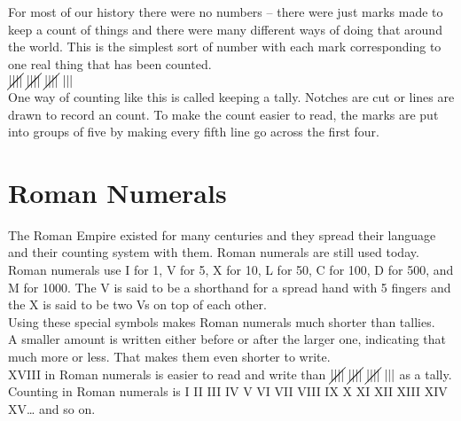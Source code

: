 \documentclass{article}
\begin{document}
For most of our history there were no numbers – there were just marks made to keep a count of things and there were many different ways of doing that around the world. This is the simplest sort of number with each mark corresponding to one real thing that has been counted.\\

$\cancel{||||}\ \cancel{||||}\ \cancel{||||}\ |||$\\

One way of counting like this is called keeping a tally. Notches are cut or lines are drawn to record an count. To make the count easier to read, the marks are put into groups of five by making every fifth line go across the first four.

\newpage

\section*{Roman Numerals}

The Roman Empire existed for many centuries and they spread their language and their counting system with them. Roman numerals are still used today.\\

Roman numerals use I for 1, V for 5, X for 10, L for 50, C for 100, D for 500, and M for 1000. The V is said to be a shorthand for a spread hand with 5 fingers and the X is said to be two Vs on top of each other.\\

Using these special symbols makes Roman numerals much shorter than tallies.\\

A smaller amount is written either before or after the larger one, indicating that much more or less. That makes them even shorter to write.\\

XVIII in Roman numerals is easier to read and write than $\cancel{||||}\ \cancel{||||}\ \cancel{||||}\ |||$ as a tally.\\

Counting in Roman numerals is I II III IV V VI VII VIII IX X XI XII XIII XIV XV… and so on.\\

\pagebreak
\end{document}
